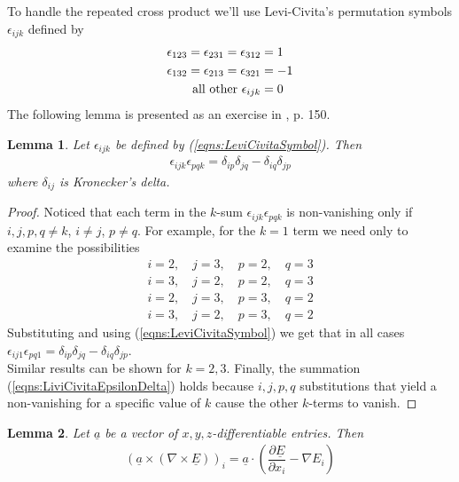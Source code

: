\documentclass[12pt,twoside]{article}
\newtheorem{lem}{Lemma}[subsubsection]
\begin{document}
To handle the repeated cross product we'll use Levi-Civita's permutation symbols $\epsilon_{ijk}$ \cite{ArfkenWeber2005} defined by
\begin{align}
\label{eqns:LeviCivitaSymbol}
\epsilon_{123} = \epsilon_{231} = \epsilon_{312} & = 1	\notag\\
\epsilon_{132} = \epsilon_{213} = \epsilon_{321} &= -1 \\
\text{all other } \epsilon_{ijk} &= 0	\notag
\end{align}
The following lemma is presented as an exercise in \cite{ArfkenWeber2005}, p. 150.
\begin{lem}
\label{lem:LiviCivitaEpsDelta}
Let $\epsilon_{ijk}$ be defined by (\ref{eqns:LeviCivitaSymbol}). Then
\begin{align}
\label{eqns:LiviCivitaEpsilonDelta} 
\epsilon_{ijk} \epsilon_{pqk} = \delta_{ip} \delta_{jq} - \delta_{iq} \delta_{jp}
\end{align} 
where $\delta_{ij}$ is Kronecker's delta.
\end{lem}

\begin{proof}
Noticed that each term in the $k$-sum $\epsilon_{ijk} \epsilon_{pqk}$ is non-vanishing only if $i,j,p,q \neq k$, $i \neq j$, $p \neq q$. For example, for the $k=1$ term we need only to examine the possibilities 
\begin{align*}
i=2,\quad j=3, \quad p=2, \quad q=3	\\
i=3,\quad j=2, \quad p=2, \quad q=3	\\
i=2,\quad j=3, \quad p=3, \quad q=2	\\
i=3,\quad j=2, \quad p=3, \quad q=2
\end{align*} 
Substituting and using (\ref{eqns:LeviCivitaSymbol}) we get that in all cases  $\epsilon_{ij1} \epsilon_{pq1} =  \delta_{ip} \delta_{jq} - \delta_{iq} \delta_{jp}$.\\
Similar results can be shown for $k=2,3$. Finally, the summation (\ref{eqns:LiviCivitaEpsilonDelta}) holds because $i,j,p,q$ substitutions that yield a non-vanishing for a specific value of $k$ cause the other $k$-terms to vanish.
\end{proof}

\begin{lem}
Let $\underline{a}$ be a vector of $x,y,z$-differentiable entries. Then 
\begin{align}
\label{eqns:doubleCrossProdDecomposition}
\left( \underline{a} \times (\nabla \times \underline{E}) \right)_i = \underline{a} \cdot \left( \dfrac{\partial \underline{E}}{\partial x_i}- \nabla E_i \right)
\end{align}
\end{lem}
\end{document}
